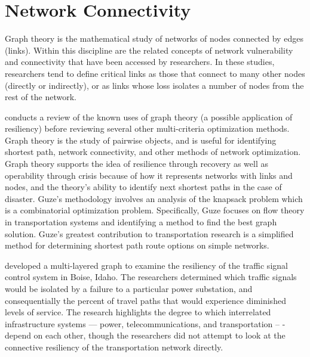 \section{Network Connectivity}

Graph theory is the mathematical study of networks of nodes connected by
edges (links). Within
this discipline are the related concepts of network vulnerability and
connectivity that have been
accessed by researchers. In these studies, researchers tend to define
critical links as those
that connect to many other nodes (directly or indirectly), or as links
whose loss isolates a
number of nodes from the rest of the network.

\citet{guze2014} conducts a review of the known uses of graph theory
(a possible application of resiliency) before
reviewing several
other multi-criteria optimization methods.
Graph theory is the study of pairwise objects, and is
useful for identifying
shortest path, network connectivity, and other methods of network
optimization. Graph theory
supports the idea of resilience through recovery as well as operability through crisis
because of how it
represents networks with links and nodes, and the theory's ability to identify next
shortest paths in the
case of disaster. Guze’s methodology
involves an
analysis of the knapsack problem which is a combinatorial optimization problem.
Specifically, Guze focuses on flow
theory in transportation
systems and identifying a method to find the best graph solution. Guze’s
greatest contribution to transportation research
is a simplified method
for determining shortest path route options on simple networks.

\citet{abdel2007} developed a multi-layered graph to examine the resiliency
of the traffic
signal control system in Boise, Idaho. The researchers determined which
traffic signals would be isolated by a failure to a particular power
substation,
and consequentially the percent of travel paths that would experience
diminished
levels of service. The research highlights the degree to which interrelated
infrastructure systems --- power, telecommunications, and transportation --
-
depend on each other, though the researchers did not attempt to look at the
connective resiliency of the transportation network directly.

